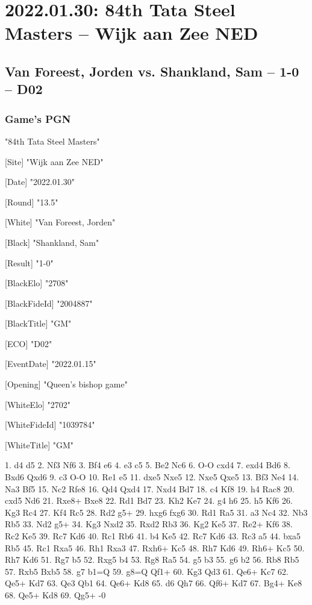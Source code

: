 \documentclass[9pt]{extarticle}
\begin{document}
\section*{2022.01.30: 84th Tata Steel Masters -- Wijk aan Zee NED}

\subsection*{Van Foreest, Jorden vs. Shankland, Sam -- 1-0 -- D02}
\subsubsection*{Game's PGN}
\begin{flushleft}
[Event] "84th Tata Steel Masters"

[Site] "Wijk aan Zee NED"

[Date] "2022.01.30"

[Round] "13.5"

[White] "Van Foreest, Jorden"

[Black] "Shankland, Sam"

[Result] "1-0"

[BlackElo] "2708"

[BlackFideId] "2004887"

[BlackTitle] "GM"

[ECO] "D02"

[EventDate] "2022.01.15"

[Opening] "Queen's bishop game"

[WhiteElo] "2702"

[WhiteFideId] "1039784"

[WhiteTitle] "GM"

\end{flushleft}
\begin{flushleft}
1. d4 d5 2. Nf3 Nf6 3. Bf4 e6 4. e3 c5 5. Be2 Nc6 6. O-O cxd4 7. exd4 Bd6 8. Bxd6 Qxd6 9. c3 O-O 10. Re1 e5 11. dxe5 Nxe5 12. Nxe5 Qxe5 13. Bf3 Ne4 14. Na3 Bf5 15. Nc2 Rfe8 16. Qd4 Qxd4 17. Nxd4 Bd7 18. c4 Kf8 19. h4 Rac8 20. cxd5 Nd6 21. Rxe8+ Bxe8 22. Rd1 Bd7 23. Kh2 Ke7 24. g4 h6 25. h5 Kf6 26. Kg3 Rc4 27. Kf4 Rc5 28. Rd2 g5+ 29. hxg6 fxg6 30. Rd1 Ra5 31. a3 Nc4 32. Nb3 Rb5 33. Nd2 g5+ 34. Kg3 Nxd2 35. Rxd2 Rb3 36. Kg2 Ke5 37. Re2+ Kf6 38. Rc2 Ke5 39. Rc7 Kd6 40. Rc1 Rb6 41. b4 Ke5 42. Rc7 Kd6 43. Rc3 a5 44. bxa5 Rb5 45. Rc1 Rxa5 46. Rh1 Rxa3 47. Rxh6+ Kc5 48. Rh7 Kd6 49. Rh6+ Kc5 50. Rh7 Kd6 51. Rg7 b5 52. Rxg5 b4 53. Rg8 Ra5 54. g5 b3 55. g6 b2 56. Rb8 Rb5 57. Rxb5 Bxb5 58. g7 b1=Q 59. g8=Q Qf1+ 60. Kg3 Qd3 61. Qe6+ Kc7 62. Qe5+ Kd7 63. Qe3 Qb1 64. Qe6+ Kd8 65. d6 Qh7 66. Qf6+ Kd7 67. Bg4+ Ke8 68. Qe5+ Kd8 69. Qg5+ \quad  {}-0
\end{flushleft}
\end{document}
